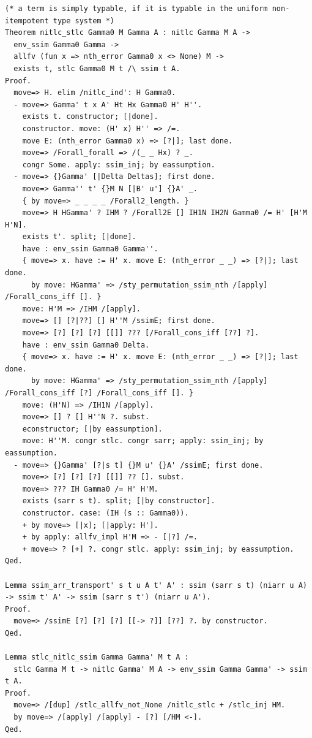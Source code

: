 \documentclass[10pt,a4paper]{article}
\begin{document}
\begin{lstlisting}[style=authorcoq]
(* a term is simply typable, if it is typable in the uniform non-itempotent type system *)
Theorem nitlc_stlc Gamma0 M Gamma A : nitlc Gamma M A ->
  env_ssim Gamma0 Gamma ->
  allfv (fun x => nth_error Gamma0 x <> None) M ->
  exists t, stlc Gamma0 M t /\ ssim t A.
Proof.
  move=> H. elim /nitlc_ind': H Gamma0.
  - move=> Gamma' t x A' Ht Hx Gamma0 H' H''.
    exists t. constructor; [|done].
    constructor. move: (H' x) H'' => /=.
    move E: (nth_error Gamma0 x) => [?|]; last done.
    move=> /Forall_forall => /(_ _ Hx) ? _.
    congr Some. apply: ssim_inj; by eassumption.
  - move=> {}Gamma' [|Delta Deltas]; first done.
    move=> Gamma'' t' {}M N [|B' u'] {}A' _.
    { by move=> _ _ _ _ /Forall2_length. }
    move=> H HGamma' ? IHM ? /Forall2E [] IH1N IH2N Gamma0 /= H' [H'M H'N].
    exists t'. split; [|done].
    have : env_ssim Gamma0 Gamma''.
    { move=> x. have := H' x. move E: (nth_error _ _) => [?|]; last done.
      by move: HGamma' => /sty_permutation_ssim_nth /[apply] /Forall_cons_iff []. }
    move: H'M => /IHM /[apply].
    move=> [] [?|??] [] H''M /ssimE; first done.
    move=> [?] [?] [?] [[]] ??? [/Forall_cons_iff [??] ?].
    have : env_ssim Gamma0 Delta.
    { move=> x. have := H' x. move E: (nth_error _ _) => [?|]; last done.
      by move: HGamma' => /sty_permutation_ssim_nth /[apply] /Forall_cons_iff [?] /Forall_cons_iff []. }
    move: (H'N) => /IH1N /[apply].
    move=> [] ? [] H''N ?. subst.
    econstructor; [|by eassumption].
    move: H''M. congr stlc. congr sarr; apply: ssim_inj; by eassumption.
  - move=> {}Gamma' [?|s t] {}M u' {}A' /ssimE; first done.
    move=> [?] [?] [?] [[]] ?? []. subst.
    move=> ??? IH Gamma0 /= H' H'M.
    exists (sarr s t). split; [|by constructor].
    constructor. case: (IH (s :: Gamma0)).
    + by move=> [|x]; [|apply: H'].
    + by apply: allfv_impl H'M => - [|?] /=.
    + move=> ? [+] ?. congr stlc. apply: ssim_inj; by eassumption.
Qed.

Lemma ssim_arr_transport' s t u A t' A' : ssim (sarr s t) (niarr u A) -> ssim t' A' -> ssim (sarr s t') (niarr u A').
Proof.
  move=> /ssimE [?] [?] [?] [[-> ?]] [??] ?. by constructor.
Qed.

Lemma stlc_nitlc_ssim Gamma Gamma' M t A :
  stlc Gamma M t -> nitlc Gamma' M A -> env_ssim Gamma Gamma' -> ssim t A.
Proof.
  move=> /[dup] /stlc_allfv_not_None /nitlc_stlc + /stlc_inj HM.
  by move=> /[apply] /[apply] - [?] [/HM <-].
Qed.


\end{lstlisting}
\end{document}
